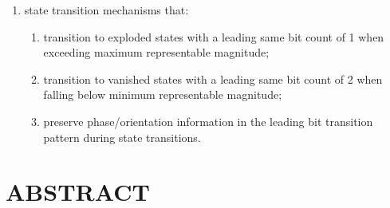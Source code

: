 \documentclass[12pt,letter]{article}
\begin{document}
\begin{enumerate}
\begin{enumerate}
\begin{enumerate}
\begin{enumerate}
                                  \item multiply two's complement fractions while adding exponents, transitioning to exploded states rather than infinity when overflow occurs and to vanished states rather than zero when underflow occurs, thereby ensuring $a \times b = 0$ if and only if $a = 0$ or $b = 0$, and $MAX \times MAX \neq \infty$;
                                  \item divide two's complement fractions while subtracting exponents, transitioning to exploded states rather than infinity when overflow occurs and to vanished states rather than zero when underflow occurs, thereby ensuring non-zero ÷ non-zero never produces zero or infinity, non-zero ÷ 0 produces infinity, and 0 ÷ non-zero produces zero;
                              \end{enumerate}
                        \item state transition mechanisms that:
                              \begin{enumerate}
                                  \item transition to exploded states with a leading same bit count of 1 when exceeding maximum representable magnitude;
                                  \item transition to vanished states with a leading same bit count of 2 when falling below minimum representable magnitude;
                                  \item preserve phase/orientation information in the leading bit transition pattern during state transitions.
                              \end{enumerate}
                    \end{enumerate}
          \end{enumerate}
\end{enumerate}

\newpage

\section*{ABSTRACT}
\end{document}
